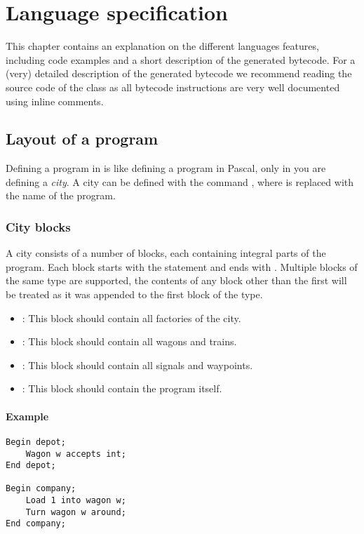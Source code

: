 \chapter{Language specification}

This chapter contains an explanation on the different languages features, including code examples and a short description of the generated bytecode. For a (very) detailed description of the generated bytecode we recommend reading the source code of the  class as all bytecode instructions are very well documented using inline comments.

\section{Layout of a program}

Defining a program in \shortname is like defining a program in Pascal, only in \shortname you are defining a \emph{city}. A city can be defined with the command , where  is replaced with the name of the program.

\subsection{City blocks}

A city consists of a number of blocks, each containing integral parts of the program. Each block starts with the statement  and ends with . Multiple blocks of the same type are supported, the contents of any block other than the first will be treated as it was appended to the first block of the type.

\begin{itemize}
\item {}: This block should contain all factories of the city.
\item {}: This block should contain all wagons and trains.
\item {}: This block should contain all signals and waypoints.
\item {}: This block should contain the program itself.
\end{itemize}

\subsubsection*{Example}

\begin{lstlisting}
Begin depot;
	Wagon w accepts int;
End depot;

Begin company;
	Load 1 into wagon w;
	Turn wagon w around;
End company;
\end{lstlisting}

